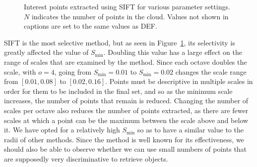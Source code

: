 \documentclass[11pt,a4paper]{kth-mag}
\begin{document}
\begin{figure}
{    
  }
  \caption{Interest points extracted using SIFT for various parameter settings.
    $N$ indicates the number of points in the cloud. Values not shown in
    captions are set to the same values as DEF.}
  \label{fig:intsift}
\end{figure}

SIFT is the most selective method, but as seen in Figure~\ref{fig:intsift}, its
selectivity is greatly affected the value of $S_{\min}$. Doubling this value has
a large effect on the range of scales that are examined by the method. Since
each octave doubles the scale, with $o=4$, going from $S_{\min}=0.01$ to
$S_{\min}=0.02$ changes the scale range from $\left[0.01,0.08\right]$ to
$\left[0.02,0.16\right]$. Points must be descriptive in multiple scales in order
for them to be included in the final set, and so as the minimum scale increases,
the number of points that remain is reduced. Changing the number of scales per
octave also reduces the number of points extracted, as there are fewer scales at
which a point can be the maximum between the scale above and below it. We have
opted for a relatively high $S_{\min}$ so as to have a similar value to the
radii of other methods. Since the method is well known for its effectiveness, we
should also be able to observe whether we can use small numbers of points that
are supposedly very discriminative to retrieve objects.
\end{document}
